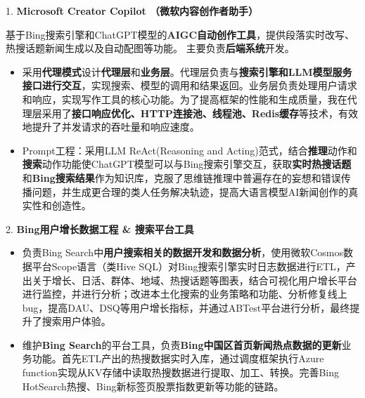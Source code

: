 \documentclass{resume}
\begin{document}
  1. \textbf{Microsoft Creator Copilot （微软内容创作者助手）} 
  \begin{spacing}{1.2} 
  基于Bing搜索引擎和ChatGPT模型的\textbf{AIGC自动创作工具}，提供段落实时改写、热搜话题新闻生成以及自动配图等功能。
  主要负责\textbf{后端系统}开发。
  \begin{itemize}
    \item 采用\textbf{代理模式}设计\textbf{代理层}和\textbf{业务层}。代理层负责与\textbf{搜索引擎和LLM模型服务接口进行交互}，实现搜索、模型的调用和结果返回。业务层负责处理用户请求和响应，实现写作工具的核心功能。为了提高框架的性能和生成质量，我在代理层采用了\textbf{接口响应优化、HTTP连接池、线程池、Redis缓存}等技术，有效地提升了并发请求的吞吐量和响应速度。
    \item Prompt工程：采用LLM ReAct(Reasoning and Acting)范式，结合\textbf{推理}动作和\textbf{搜索}动作功能使ChatGPT模型可以与Bing搜索引擎交互，获取\textbf{实时热搜话题}和\textbf{Bing搜索结果}作为知识库，克服了思维链推理中普遍存在的妄想和错误传播问题，并生成更合理的类人任务解决轨迹，提高大语言模型AI新闻创作的真实性和创造性。
  \end{itemize}
  2. \textbf{Bing用户增长数据工程 \& 搜索平台工具}
  \begin{itemize}
    \item 负责Bing Search中\textbf{用户搜索相关的数据开发和数据分析}，使用微软Cosmos数据平台Scope语言（类Hive SQL）对Bing搜索引擎实时日志数据进行ETL，产出关于增长、日活、群体、地域、热搜话题等图表，结合可视化用户增长平台进行监控，并进行分析；改进本土化搜索的业务策略和功能、分析修复线上bug，提高DAU、DSQ等用户增长指标，并通过ABTest平台进行分析，最终提升了搜索用户体验。
    \item 维护\textbf{Bing Search}的平台工具，负责\textbf{Bing中国区首页新闻热点数据的更新}业务功能。首先ETL产出的热搜数据实时入库，通过调度框架执行Azure function实现从KV存储中读取热搜数据进行提取、加工、转换。完善Bing HotSearch热搜、Bing新标签页股票指数更新等功能的链路。
  \end{itemize}
\end{spacing}
 
\end{document}

